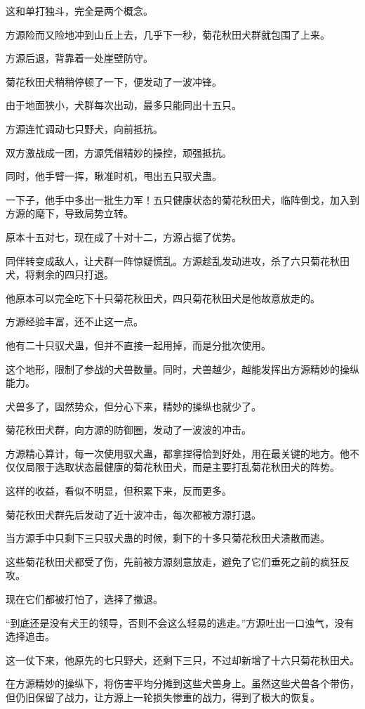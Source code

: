 \begin{this_body}
这和单打独斗，完全是两个概念。

方源险而又险地冲到山丘上去，几乎下一秒，菊花秋田犬群就包围了上来。

方源后退，背靠着一处崖壁防守。

菊花秋田犬稍稍停顿了一下，便发动了一波冲锋。

由于地面狭小，犬群每次出动，最多只能同出十五只。

方源连忙调动七只野犬，向前抵抗。

双方激战成一团，方源凭借精妙的操控，顽强抵抗。

同时，他手臂一挥，瞅准时机，甩出五只驭犬蛊。

一下子，他手中多出一批生力军！五只健康状态的菊花秋田犬，临阵倒戈，加入到方源的麾下，导致局势立转。

原本十五对七，现在成了十对十二，方源占据了优势。

同伴转变成敌人，让犬群一阵惊疑慌乱。方源趁乱发动进攻，杀了六只菊花秋田犬，将剩余的四只打退。

他原本可以完全吃下十只菊花秋田犬，四只菊花秋田犬是他故意放走的。

方源经验丰富，还不止这一点。

他有二十只驭犬蛊，但并不直接一起用掉，而是分批次使用。

这个地形，限制了参战的犬兽数量。同时，犬兽越少，越能发挥出方源精妙的操纵能力。

犬兽多了，固然势众，但分心下来，精妙的操纵也就少了。

菊花秋田犬群，向方源的防御圈，发动了一波波的冲击。

方源精心算计，每一次使用驭犬蛊，都拿捏得恰到好处，用在最关键的地方。他不仅仅局限于选取状态最健康的菊花秋田犬，而是主要打乱菊花秋田犬的阵势。

这样的收益，看似不明显，但积累下来，反而更多。

菊花秋田犬群先后发动了近十波冲击，每次都被方源打退。

当方源手中只剩下三只驭犬蛊的时候，剩下的十多只菊花秋田犬溃散而逃。

这些菊花秋田犬都受了伤，先前被方源刻意放走，避免了它们垂死之前的疯狂反攻。

现在它们都被打怕了，选择了撤退。

“到底还是没有犬王的领导，否则不会这么轻易的逃走。”方源吐出一口浊气，没有选择追击。

这一仗下来，他原先的七只野犬，还剩下三只，不过却新增了十六只菊花秋田犬。

在方源精妙的操纵下，将伤害平均分摊到这些犬兽身上。虽然这些犬兽各个带伤，但仍旧保留了战力，让方源上一轮损失惨重的战力，得到了极大的恢复。

\end{this_body}

